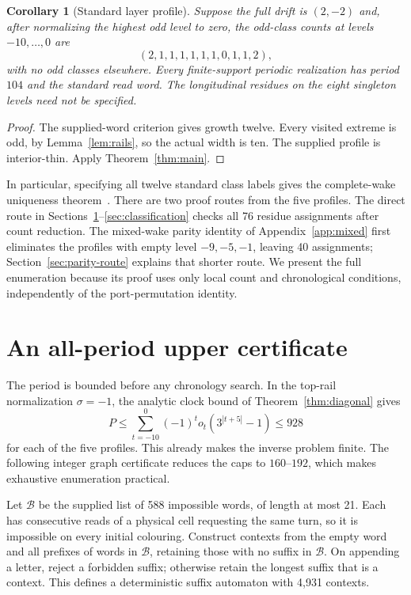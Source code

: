 \documentclass[11pt]{article}
\newtheorem{corollary}[theorem]{Corollary}
\theoremstyle{definition}\newtheorem{definition}[theorem]{Definition}
\begin{document}
\begin{corollary}[Standard layer profile]\label{cor:profile}
Suppose the full drift is $(2,-2)$ and, after normalizing the highest odd
level to zero, the odd-class counts at levels $-10,\ldots,0$ are
\[
(2,1,1,1,1,1,1,0,1,1,2),
\]
with no odd classes elsewhere. Every finite-support periodic realization
has period $104$ and the standard read word. The longitudinal residues on
the eight singleton levels need not be specified.
\end{corollary}
\begin{proof}
The supplied-word criterion gives growth twelve. Every visited extreme is
odd, by Lemma~\ref{lem:rails}, so the actual width is ten. The supplied
profile is interior-thin. Apply Theorem~\ref{thm:main}.
\end{proof}
In particular, specifying all twelve standard class labels gives the
complete-wake uniqueness theorem~\cite{KeStandard}.
There are two proof routes from the five profiles. The direct route in
Sections~\ref{sec:upper}--\ref{sec:classification} checks all 76 residue
assignments after count reduction. The mixed-wake parity identity of
Appendix~\ref{app:mixed} first eliminates the profiles with empty level
$-9,-5,-1$, leaving 40 assignments; Section~\ref{sec:parity-route} explains
that shorter route. We present the full enumeration because its proof uses
only local count and chronological conditions, independently of the
port-permutation identity.

\section{An all-period upper certificate}\label{sec:upper}
The period is bounded before any chronology search. In the top-rail
normalization $\sigma=-1$, the analytic clock bound of
Theorem~\ref{thm:diagonal} gives
\[
 P\le\sum_{t=-10}^0(-1)^t o_t(3^{|t+5|}-1)\le928
\]
for each of the five profiles. This already makes the inverse problem finite.
The following integer graph certificate reduces the caps to $160$--$192$,
which makes exhaustive enumeration practical.

Let $\mathcal B$ be the supplied list of 588 impossible words, of length
at most 21. Each has consecutive reads of a physical cell requesting the
same turn, so it is impossible on every initial colouring. Construct contexts
from the empty word and all prefixes of words in $\mathcal B$, retaining
those with no suffix in $\mathcal B$. On appending a letter, reject a forbidden
suffix; otherwise retain the longest suffix that is a context. This defines
a deterministic suffix automaton with 4,931 contexts.
\end{document}
